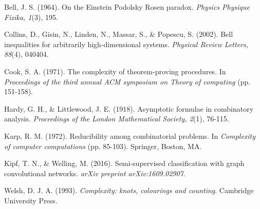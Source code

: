 \documentclass[12pt, letterpaper]{article}
\begin{document}
\begin{thebibliography}{99}
     Bell, J. S. (1964). On the Einstein Podolsky Rosen paradox. \textit{Physics Physique Fizika, 1}(3), 195.

     Collins, D., Gisin, N., Linden, N., Massar, S., \& Popescu, S. (2002). Bell inequalities for arbitrarily high-dimensional systems. \textit{Physical Review Letters, 88}(4), 040404.
    
     Cook, S. A. (1971). The complexity of theorem-proving procedures. In \textit{Proceedings of the third annual ACM symposium on Theory of computing} (pp. 151-158).
    
     Hardy, G. H., \& Littlewood, J. E. (1918). Asymptotic formulae in combinatory analysis. \textit{Proceedings of the London Mathematical Society, 2}(1), 76-115.

     Karp, R. M. (1972). Reducibility among combinatorial problems. In \textit{Complexity of computer computations} (pp. 85-103). Springer, Boston, MA.
        
     Kipf, T. N., \& Welling, M. (2016). Semi-supervised classification with graph convolutional networks. \textit{arXiv preprint arXiv:1609.02907}.
    
     Welsh, D. J. A. (1993). \textit{Complexity: knots, colourings and counting}. Cambridge University Press.

\end{thebibliography}
\end{document}
